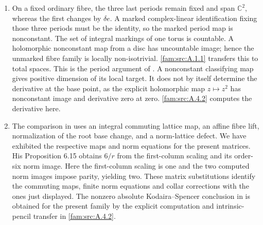\begin{remark}\hypertarget{tag-01Q5}{}\label{fam:src:A.4.3}\label{fam:st:A.4.3}

\begin{enumerate}[label=\arabic*.,leftmargin=*]
\item On a fixed ordinary fibre, the three last periods remain fixed and span $\mathbb C^2$, whereas the first changes by $\delta e$. A marked complex-linear identification fixing those three periods must be the identity, so the marked period map is nonconstant. The set of integral markings of one torus is countable. A holomorphic nonconstant map from a disc has uncountable image; hence the unmarked fibre family is locally non-isotrivial. \ref{fam:src:A.1.1} transfers this to total spaces. This is the period argument of \cite[Proposition~4.7, pp.~14--15]{ViaclovskyLog2026}. A nonconstant classifying map gives positive dimension of its local target. It does not by itself determine the derivative at the base point, as the explicit holomorphic map $z\mapsto z^2$ has nonconstant image and derivative zero at zero. \ref{fam:src:A.4.2} computes the derivative here.

\item The comparison in \cite[Lemmas~6.6--6.7 and~6.9, pp.~31--32; Remark~6.8, p.~32; Proposition~6.15, pp.~37--38]{Yang2026} uses an integral commuting lattice map, an affine fibre lift, normalization of the root base change, and a norm-lattice defect. We have exhibited the respective maps and norm equations for the present matrices. His Proposition 6.15 obtains $6/r$ from the first-column scaling and its order-six norm image. Here the first-column scaling is one and the two computed norm images impose parity, yielding two. These matrix substitutions identify the commuting maps, finite norm equations and collar corrections with the ones just displayed. The nonzero absolute Kodaira--Spencer conclusion in \cite[Theorem~6.18, p.~39]{Yang2026} is obtained for the present family by the explicit computation and intrinsic-pencil transfer in \cref{fam:src:A.4.2}.
\end{enumerate}
\end{remark}